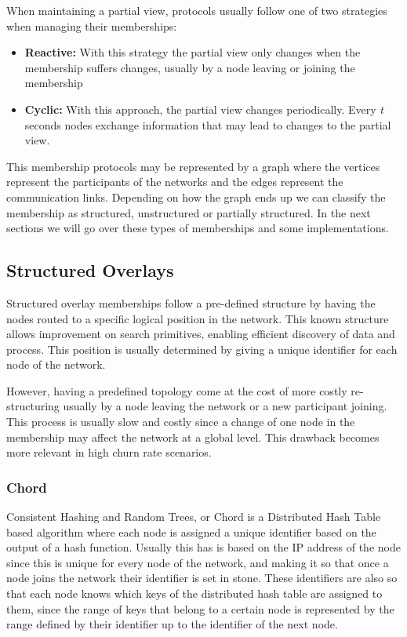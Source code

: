 When maintaining a partial view, protocols usually follow one of two strategies
when managing their memberships:

\begin{itemize}
  \item \textbf{Reactive:} With this strategy the partial view only changes when
the membership suffers changes, usually by a node leaving or joining the membership
  \item \textbf{Cyclic:} With this approach, the partial view changes periodically.
Every \textit{t} seconds nodes exchange information that may lead to changes to the
partial view.
\end{itemize}

This membership protocols may be represented by a graph where the vertices represent
the participants of the networks and the edges represent the communication links.
Depending on how the graph ends up we can classify the membership as structured,
unstructured or partially structured. In the next sections we will go over these
types of memberships and some implementations.

\subsection{Structured Overlays}
\label{sub:structured_overlays}

Structured overlay memberships follow a pre-defined structure by having the nodes
routed to a specific logical position in the network. This known structure allows
improvement on search primitives, enabling efficient discovery of data and process.
This position is usually determined by giving a unique identifier for each node of the
network.

However, having a predefined topology come at the cost of more costly re-structuring
usually by a node leaving the network or a new participant joining. This process
is usually slow and costly since a change of one node in the membership may affect
the network at a global level. This drawback becomes more relevant in high churn rate
scenarios.

\subsubsection{Chord}
\label{subsec:chord}

Consistent Hashing and Random Trees, or Chord \cite{chord} is a Distributed Hash
Table based algorithm where each node is assigned a unique identifier based on
the output of a hash function. Usually this has is based on the IP address of
the node since this is unique for every node of the network, and making it so
that once a node joins the network their identifier is set in stone. These
identifiers are also so that each node knows which keys of the distributed hash
table are assigned to them, since the range of keys that belong to a certain
node is represented by the range defined by their identifier up to the
identifier of the next node.

